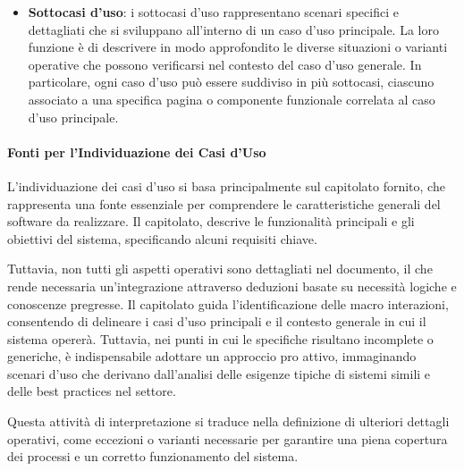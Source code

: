 \begin{itemize}
\begin{itemize}
    \end{itemize}

    \item \textbf{Sottocasi d'uso}: i sottocasi d'uso rappresentano scenari specifici e dettagliati che si sviluppano all'interno di un caso d'uso principale. La loro funzione è di descrivere in modo approfondito le diverse situazioni o varianti operative che possono verificarsi nel contesto del caso d'uso generale.
    In particolare, ogni caso d'uso può essere suddiviso in più sottocasi, ciascuno associato a una specifica pagina o componente funzionale correlata al caso d'uso principale.
    
\end{itemize}

\paragraph{Fonti per l'Individuazione dei Casi d'Uso}
L'individuazione dei casi d'uso si basa principalmente sul capitolato fornito, che rappresenta una fonte essenziale per comprendere le caratteristiche generali del software da realizzare. 
Il capitolato, descrive le funzionalità principali e gli obiettivi del sistema, specificando alcuni requisiti chiave. 

Tuttavia, non tutti gli aspetti operativi sono dettagliati nel documento, il che rende necessaria un'integrazione attraverso deduzioni basate su necessità logiche e conoscenze pregresse. 
Il capitolato guida l'identificazione delle macro interazioni, consentendo di delineare i casi d'uso principali e il contesto generale in cui il sistema opererà. 
Tuttavia, nei punti in cui le specifiche risultano incomplete o generiche, è indispensabile adottare un approccio pro attivo, immaginando scenari d'uso che derivano dall'analisi delle esigenze tipiche di sistemi simili e delle best practices nel settore.

Questa attività di interpretazione si traduce nella definizione di ulteriori dettagli operativi, come eccezioni o varianti necessarie per garantire una piena copertura dei processi e un corretto funzionamento del sistema.

